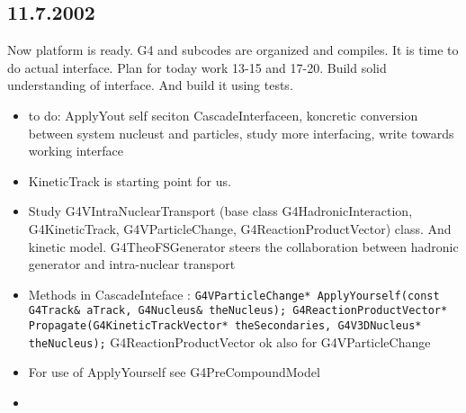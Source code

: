 \begin{appendix}
\subsection{11.7.2002}
Now platform is ready. G4 and subcodes are organized and compiles. It is time to do actual interface.
Plan for today work 13-15 and 17-20. Build solid understanding of interface. And build it using tests.
\begin{itemize}
\item to do: ApplyYout self seciton CascadeInterfaceen, koncretic conversion between system nucleust and particles, study more interfacing, write towards working interface
\item KineticTrack is starting point for us.
\item Study G4VIntraNuclearTransport (base class G4HadronicInteraction, G4KineticTrack, G4VParticleChange, G4ReactionProductVector) class. And kinetic model. G4TheoFSGenerator steers the collaboration between hadronic generator and intra-nuclear transport
\item Methods in CascadeInteface :  {\tt G4VParticleChange* ApplyYourself(const G4Track\& aTrack, G4Nucleus\& theNucleus);
   G4ReactionProductVector* Propagate(G4KineticTrackVector* theSecondaries, G4V3DNucleus* theNucleus);}  G4ReactionProductVector ok also for G4VParticleChange
\item For use of ApplyYourself see G4PreCompoundModel
\item
\end{itemize}


\end{appendix}

